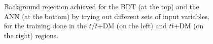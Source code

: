 \documentclass[a4paper, 10pt, openright]{report}
\begin{document}
\begin{appendices}
\begin{figure}[htbp]
{\begin{minipage}[b]{.48\textwidth}
\end{minipage} \hfill
}
\caption{Background rejection achieved for the \ac{BDT} (at the top) and the \ac{ANN} (at the bottom) by trying out different sets of input variables, for the training done in the $t/ \bar t$+DM (on the left) and $t \bar t$+DM (on the right) regions.}
\label{fig:InputVarROC}
\end{figure}

%

\end{appendices}
\end{document}
